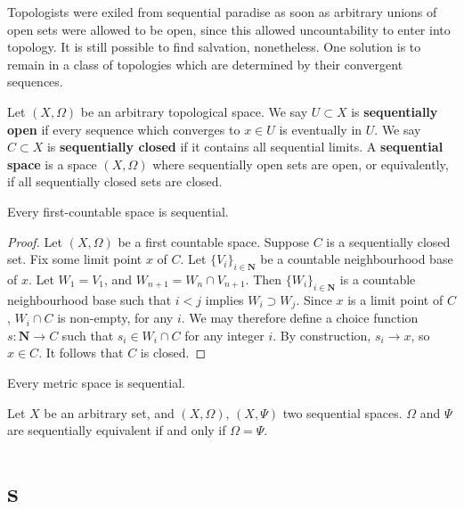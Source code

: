 Topologists were exiled from sequential paradise as soon as arbitrary unions of open sets were allowed to be open, since this allowed uncountability to enter into topology. It is still possible to find salvation, nonetheless. One solution is to remain in a class of topologies which are determined by their convergent sequences.

\begin{definition}
    Let $(X,\Omega)$ be an arbitrary topological space. We say $U \subset X$ is {\bf sequentially open} if every sequence which converges to $x \in U$ is eventually in $U$. We say $C \subset X$ is {\bf sequentially closed} if it contains all sequential limits. A {\bf sequential space} is a space $(X,\Omega)$ where sequentially open sets are open, or equivalently, if all sequentially closed sets are closed.
\end{definition}

\begin{lemma}
    Every first-countable space is sequential.
\end{lemma}
\begin{proof}
    Let $(X,\Omega)$ be a first countable space. Suppose $C$ is a sequentially closed set. Fix some limit point $x$ of $C$.  Let $\{ V_i \}_{i \in \mathbf{N}}$ be a countable neighbourhood base of $x$. Let $W_1 = V_1$, and $W_{n+1} = W_n \cap V_{n+1}$. Then $\{ W_i \}_{i \in \mathbf{N}}$ is a countable neighbourhood base such that $i < j$ implies $W_i \supset W_j$. Since $x$ is a limit point of $C$, $W_i \cap C$ is non-empty, for any $i$. We may therefore define a choice function $s: \mathbf{N} \to C$ such that $s_i \in W_i \cap C$ for any integer $i$. By construction, $s_i \to x$, so $x \in C$. It follows that $C$ is closed.
\end{proof}

\begin{corollary}
    Every metric space is sequential.
\end{corollary}

\begin{exercise}
    Let $X$ be an arbitrary set, and $(X, \Omega)$, $(X, \Psi)$ two sequential spaces. $\Omega$ and $\Psi$ are sequentially equivalent if and only if $\Omega = \Psi$.
\end{exercise}







\section{s}

